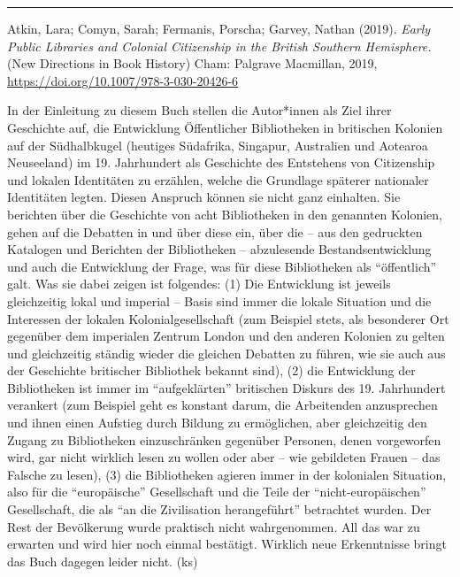 \documentclass[a4paper,
fontsize=11pt,
oneside,
numbers=noperiodatend,
parskip=half-,
bibliography=totoc,
final
]{scrartcl}
\begin{document}
\begin{center}\rule{0.5\linewidth}{0.5pt}\end{center}

Atkin, Lara; Comyn, Sarah; Fermanis, Porscha; Garvey, Nathan (2019).
\emph{Early Public Libraries and Colonial Citizenship in the British
Southern Hemisphere.} (New Directions in Book History) Cham: Palgrave
Macmillan, 2019, \url{https://doi.org/10.1007/978-3-030-20426-6}

In der Einleitung zu diesem Buch stellen die Autor*innen als Ziel ihrer
Geschichte auf, die Entwicklung Öffentlicher Bibliotheken in britischen
Kolonien auf der Südhalbkugel (heutiges Südafrika, Singapur, Australien
und Aotearoa Neuseeland) im 19. Jahrhundert als Geschichte des
Entstehens von Citizenship und lokalen Identitäten zu erzählen, welche
die Grundlage späterer nationaler Identitäten legten. Diesen Anspruch
können sie nicht ganz einhalten. Sie berichten über die Geschichte von
acht Bibliotheken in den genannten Kolonien, gehen auf die Debatten in
und über diese ein, über die -- aus den gedruckten Katalogen und
Berichten der Bibliotheken -- abzulesende Bestandsentwicklung und auch
die Entwicklung der Frage, was für diese Bibliotheken als
\enquote{öffentlich} galt. Was sie dabei zeigen ist folgendes: (1) Die
Entwicklung ist jeweils gleichzeitig lokal und imperial -- Basis sind
immer die lokale Situation und die Interessen der lokalen
Kolonialgesellschaft (zum Beispiel stets, als besonderer Ort gegenüber
dem imperialen Zentrum London und den anderen Kolonien zu gelten und
gleichzeitig ständig wieder die gleichen Debatten zu führen, wie sie
auch aus der Geschichte britischer Bibliothek bekannt sind), (2) die
Entwicklung der Bibliotheken ist immer im \enquote{aufgeklärten}
britischen Diskurs des 19. Jahrhundert verankert (zum Beispiel geht es
konstant darum, die Arbeitenden anzusprechen und ihnen einen Aufstieg
durch Bildung zu ermöglichen, aber gleichzeitig den Zugang zu
Bibliotheken einzuschränken gegenüber Personen, denen vorgeworfen wird,
gar nicht wirklich lesen zu wollen oder aber -- wie gebildeten Frauen --
das Falsche zu lesen), (3) die Bibliotheken agieren immer in der
kolonialen Situation, also für die \enquote{europäische} Gesellschaft
und die Teile der \enquote{nicht-europäischen} Gesellschaft, die als
\enquote{an die Zivilisation herangeführt} betrachtet wurden. Der Rest
der Bevölkerung wurde praktisch nicht wahrgenommen. All das war zu
erwarten und wird hier noch einmal bestätigt. Wirklich neue Erkenntnisse
bringt das Buch dagegen leider nicht. (ks)
\end{document}

